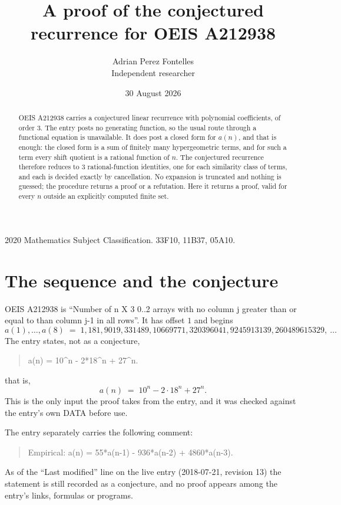 \documentclass[11pt,a4paper]{article}
\title{A proof of the conjectured recurrence for OEIS A212938}
\author{Adrian Perez Fontelles\\ \small Independent researcher}
\date{30 August 2026}
\theoremstyle{plain}
\theoremstyle{definition}
\begin{document}
\maketitle

\begin{abstract}
OEIS A212938 carries a conjectured linear recurrence with polynomial coefficients, of
order 3. The entry posts no generating function, so the usual route through a
functional equation is unavailable. It does post a closed form for $a(n)$, and that is
enough: the closed form is a sum of finitely many hypergeometric terms, and for such a
term every shift quotient is a rational function of $n$. The conjectured recurrence
therefore reduces to 3 rational-function identities, one for each similarity
class of terms, and each is decided exactly by cancellation. No expansion is truncated and
nothing is guessed; the procedure returns a proof or a refutation. Here it returns a proof,
valid for every $n$ outside an explicitly computed finite set.
\end{abstract}

\noindent\small 2020 Mathematics Subject Classification. 33F10, 11B37, 05A10.\normalsize

\section{The sequence and the conjecture}

OEIS A212938 is ``Number of n X 3 0..2 arrays with no column j greater than or equal to than column j-1 in all rows''. It has offset $1$ and begins
\[
a(1),\dots,a(8)\;=\;1, 181, 9019, 331489, 10669771, 320396041, 9245913139, 260489615329,\ \dots
\]
The entry states, not as a conjecture,
\begin{quote}\small
a(n) = 10\textasciicircum{}n - 2*18\textasciicircum{}n + 27\textasciicircum{}n.
\end{quote}
that is,
\begin{equation}\label{eq:cf}
a(n)\;=\;10^{n} - 2 \cdot 18^{n} + 27^{n} .
\end{equation}
This is the only input the proof takes from the entry, and it was checked against the
entry's own DATA before use.

The entry separately carries the following comment:
\begin{quote}\small
Empirical: a(n) = 55*a(n-1) - 936*a(n-2) + 4860*a(n-3).
\end{quote}
As of the ``Last modified'' line on the live entry (2018-07-21, revision 13) the
statement is still recorded as a conjecture, and no proof appears among the entry's links,
formulas or programs.
\end{document}
